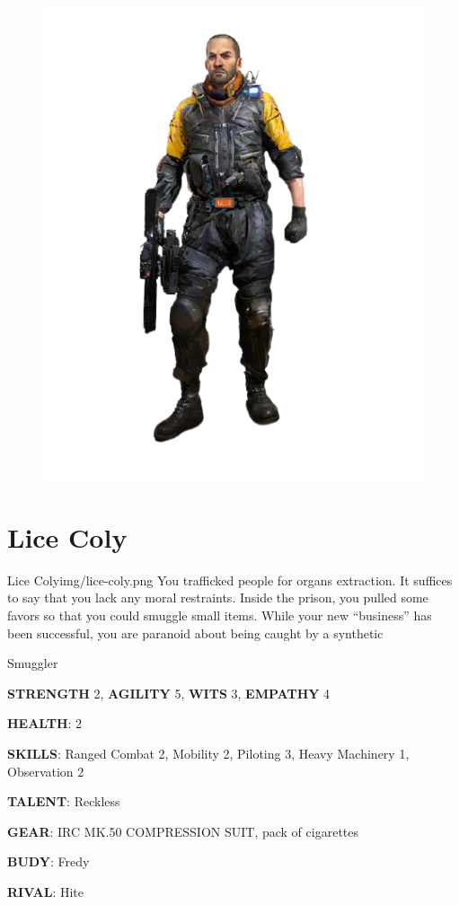 \begin{figure}
    \hspace*{-1in}
    \includegraphics[width=.65\textwidth]{img/bg/firefighter-6.png}
    \label{fig:refinery}
\end{figure}

\clearpage





\section{Lice Coly}

\begin{rpg-pcbox}{Lice Coly}{img/lice-coly.png}
    You trafficked people for organs extraction. It suffices to say that you lack any moral restraints.
    Inside the prison, you pulled some favors so that you could smuggle small items. While your new ``business'' has been successful, you are paranoid about being caught by a synthetic
\end{rpg-pcbox}

\begin{rpg-commentbox}{}
    Smuggler

    \textbf{STRENGTH} 2, \textbf{AGILITY} 5, \textbf{WITS} 3, \textbf{EMPATHY} 4

    \textbf{HEALTH}: 2

    \textbf{SKILLS}: Ranged Combat 2, Mobility 2, Piloting 3, Heavy Machinery 1, Observation 2
    
    \textbf{TALENT}: Reckless
    
    \textbf{GEAR}: IRC MK.50 COMPRESSION SUIT, pack of cigarettes

    \textbf{BUDY}: Fredy
    
    \textbf{RIVAL}: Hite
\end{rpg-commentbox}

